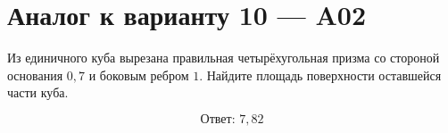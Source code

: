 \documentclass[12pt,a4paper]{article}
\begin{document}
\section*{Аналог к варианту 10 — A02}

Из единичного куба вырезана правильная четырёхугольная призма со стороной основания \(0{,}7\) и боковым ребром \(1\). Найдите площадь поверхности оставшейся части куба.

\begin{center}
\end{center}

\[
\boxed{\text{Ответ: }7{,}82}
\]
\end{document}
